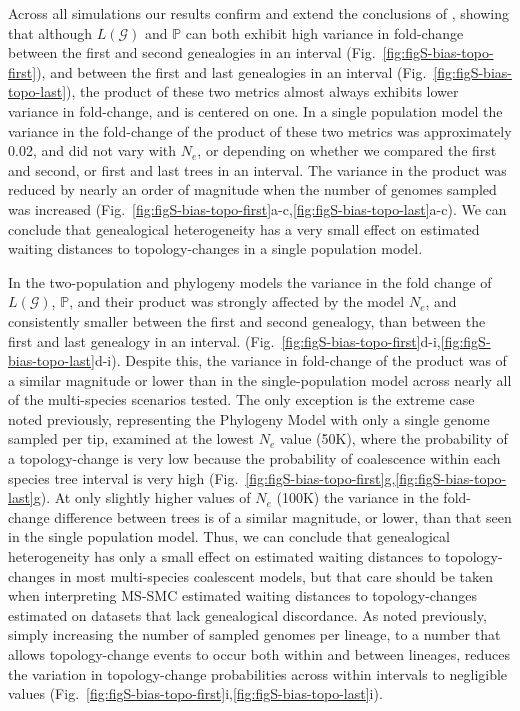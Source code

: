\documentclass[11pt]{article}
\begin{document}
Across all simulations our results confirm and extend the conclusions of 
\citet{deng_distribution_2021}, showing that although $L(\mathcal{G})$ 
and $\mathbb{P}$ can both exhibit high variance in fold-change between the 
first and second genealogies in an interval (Fig.~\ref{fig:figS-bias-topo-first}), 
and between the first and last genealogies in an interval (Fig.~\ref{fig:figS-bias-topo-last}),
the product of these two metrics almost always exhibits lower variance in
fold-change, and is centered on one.
% 
In a single population model the variance in the fold-change of the product of
these two metrics was approximately 0.02, and did not vary with $N_e$, or 
depending on whether we compared the first and second, or first and last
trees in an interval. The variance in the product was reduced by nearly 
an order of magnitude when the number of genomes sampled was increased 
(Fig.~\ref{fig:figS-bias-topo-first}a-c,\ref{fig:figS-bias-topo-last}a-c).
We can conclude that genealogical heterogeneity has a very small effect
on estimated waiting distances to topology-changes in a single population model.

% 
In the two-population and phylogeny models the variance in the fold change of 
$L(\mathcal{G})$, $\mathbb{P}$, and their product was strongly affected by the
model $N_e$, and consistently smaller between the first and second genealogy, 
than between the first and last genealogy in an interval.
(Fig.~\ref{fig:figS-bias-topo-first}d-i,\ref{fig:figS-bias-topo-last}d-i). 
% 
Despite this, the variance in fold-change of the product was of a similar
magnitude or lower than in the single-population model across nearly 
all of the multi-species scenarios tested.
% 
The only exception is the extreme case noted previously, representing the
Phylogeny Model with only a single genome sampled per tip, examined at the 
lowest $N_e$ value (50K), where the probability of a topology-change is 
very low because the probability of coalescence within each species tree
interval is very high
(Fig.~\ref{fig:figS-bias-topo-first}g,\ref{fig:figS-bias-topo-last}g).
% 
At only slightly higher values of $N_e$ (100K) the variance in the fold-change
difference between trees is of a similar magnitude, or lower, than that
seen in the single population model. 
% 
Thus, we can conclude that genealogical heterogeneity has only a small 
effect on estimated waiting distances to topology-changes in most 
multi-species coalescent models, but that care should be taken when 
interpreting MS-SMC estimated waiting distances to topology-changes estimated
on datasets that lack genealogical discordance. 
% 
As noted previously, simply increasing the number of sampled genomes
per lineage, to a number that allows topology-change events to occur both
within and between lineages, reduces the variation in topology-change 
probabilities across within intervals to negligible values
(Fig.~\ref{fig:figS-bias-topo-first}i,\ref{fig:figS-bias-topo-last}i).
\end{document}
